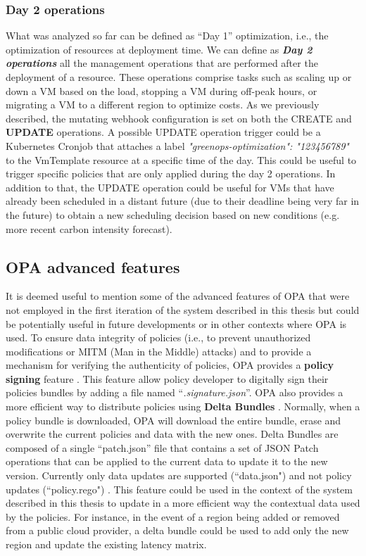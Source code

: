 \subsubsection{Day 2 operations}
\label{sec:day2_operations}

What was analyzed so far can be defined as ``Day 1'' optimization, i.e., the optimization of resources at deployment time.
We can define as \textbf{\textit{Day 2 operations}} all the management operations that are performed after the deployment of a resource.
These operations comprise tasks such as scaling up or down a VM based on the load, stopping a VM during off-peak hours, or migrating a VM to a different region to optimize costs.
As we previously described, the mutating webhook configuration is set on both the CREATE and \textbf{UPDATE} operations.
A possible UPDATE operation trigger could be a Kubernetes Cronjob that attaches a label \textit{"greenops-optimization": "123456789"} to the VmTemplate resource at a specific time of the day.
This could be useful to trigger specific policies that are only applied during the day 2 operations.
In addition to that, the UPDATE operation could be useful for VMs that have already been scheduled in a distant future (due to their deadline being very far in the future) to obtain a new scheduling decision based on new conditions (e.g. more recent carbon intensity forecast).

\subsection{OPA advanced features}

It is deemed useful to mention some of the advanced features of OPA that were not employed in the first iteration of the system described in this thesis but could be potentially useful in future developments or in other contexts where OPA is used.
\newline
To ensure data integrity of policies (i.e., to prevent unauthorized modifications or MITM (Man in the Middle) attacks) and to provide a mechanism for verifying the authenticity of policies, OPA provides a \textbf{policy signing} feature \cite{opa_signing}.
This feature allow policy developer to digitally sign their policies bundles by adding a file named ``\textit{.signature.json}''.
\newline
OPA also provides a more efficient way to distribute policies using \textbf{Delta Bundles} \cite{opa_delta_bundles}.
Normally, when a policy bundle is downloaded, OPA will download the entire bundle, erase and overwrite the current policies and data with the new ones.
Delta Bundles are composed of a single ``patch.json'' file that contains a set of JSON Patch operations that can be applied to the current data to update it to the new version. Currently only data updates are supported (``data.json") and not policy updates (``policy.rego") \cite{opa_delta_bundles}.
This feature could be used in the context of the system described in this thesis to update in a more efficient way the contextual data used by the policies. 
For instance, in the event of a region being added or removed from a public cloud provider, a delta bundle could be used to add only the new region and update the existing latency matrix.


